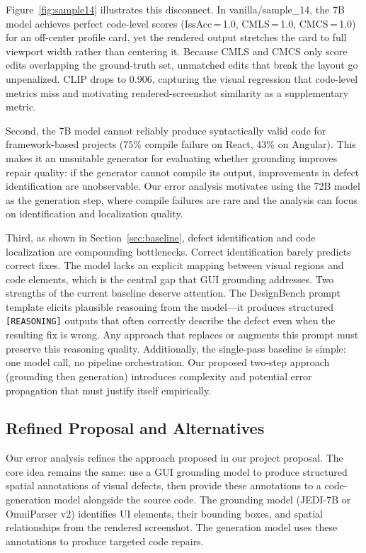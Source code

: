 \documentclass[11pt]{article}
\begin{document}
Figure~\ref{fig:sample14} illustrates this disconnect. In
vanilla/sample\_14, the 7B model achieves perfect code-level scores
(IssAcc\,=\,1.0, CMLS\,=\,1.0, CMCS\,=\,1.0) for an off-center
profile card, yet the rendered output stretches the card to full
viewport width rather than centering it. Because CMLS and CMCS only
score edits overlapping the ground-truth set, unmatched edits that
break the layout go unpenalized. CLIP drops to 0.906, capturing the
visual regression that code-level metrics miss and motivating
rendered-screenshot similarity as a supplementary metric.

Second, the 7B model cannot reliably produce syntactically valid code
for framework-based projects (75\% compile failure on React, 43\% on
Angular). This makes it an unsuitable generator for evaluating whether
grounding improves repair quality: if the generator cannot compile its
output, improvements in defect identification are unobservable. Our
error analysis motivates using the 72B model as the generation step,
where compile failures are rare and the analysis can focus on
identification and localization quality.

Third, as shown in Section~\ref{sec:baseline}, defect identification
and code localization are compounding bottlenecks. Correct
identification barely predicts correct fixes. The model lacks an
explicit mapping between visual regions and code elements, which is the
central gap that GUI grounding addresses.
Two strengths of the current baseline deserve attention. The DesignBench
prompt template elicits plausible reasoning from the model---it produces
structured \texttt{[REASONING]} outputs that often correctly describe
the defect even when the resulting fix is wrong. Any approach that
replaces or augments this prompt must preserve this reasoning quality.
Additionally, the single-pass baseline is simple: one model call, no
pipeline orchestration. Our proposed two-step approach (grounding then
generation) introduces complexity and potential error propagation that
must justify itself empirically.

\subsection{Refined Proposal and Alternatives}

Our error analysis refines the approach proposed in our project
proposal. The core idea remains the same: use a GUI grounding model to
produce structured spatial annotations of visual defects, then provide
these annotations to a code-generation model alongside the source code.
The grounding model (JEDI-7B or OmniParser v2) identifies UI elements,
their bounding boxes, and spatial relationships from the rendered
screenshot. The generation model uses these annotations to produce
targeted code repairs.
\end{document}
